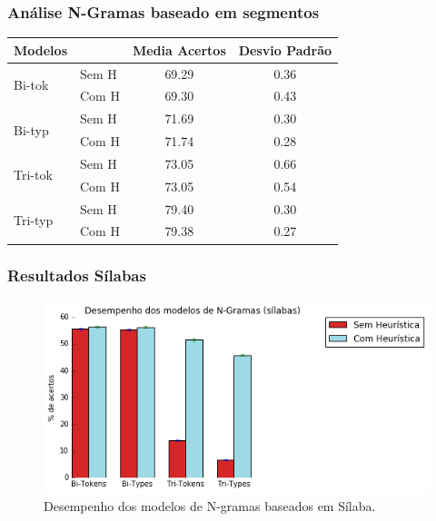 \documentclass[xcolor=table]{beamer}
\begin{document}
	\begin{frame}
		\frametitle{Análise N-Gramas baseado em segmentos}
		\centering
		\label{TAB3}
		\begin{tabular}{@{}llcc@{}}
			\textbf{Modelos}                  &       & \textbf{Media Acertos} & \textbf{Desvio Padrão}  \\ \midrule
			\multirow{2}{*}{Bi-tok}  & Sem H & 69.29 & 0.36 \\ \cmidrule(l){2-4} 
			& Com H & 69.30 & 0.43 \\ \midrule
			\multirow{2}{*}{Bi-typ}  & Sem H & 71.69 & 0.30 \\ \cmidrule(l){2-4} 
			& Com H & 71.74 & 0.28  \\ \midrule
			\multirow{2}{*}{Tri-tok} & Sem H & 73.05 & 0.66 \\ \cmidrule(l){2-4} 
			& Com H & 73.05 & 0.54 \\ \midrule
			\multirow{2}{*}{Tri-typ} & Sem H & 79.40 & 0.30 \\ \cmidrule(l){2-4} 
			& Com H & 79.38 & 0.27
		\end{tabular}
	\end{frame}
	\begin{frame}
		\frametitle{Resultados Sílabas}
\begin{figure}
\centering
\includegraphics[width=0.7\linewidth]{desempenhoN-gramas-sil}
\caption{Desempenho dos modelos de N-gramas baseados em Sílaba.}
\label{fig:desempenhoN-gramas-sil}
\end{figure}

	\end{frame}	
\end{document}
